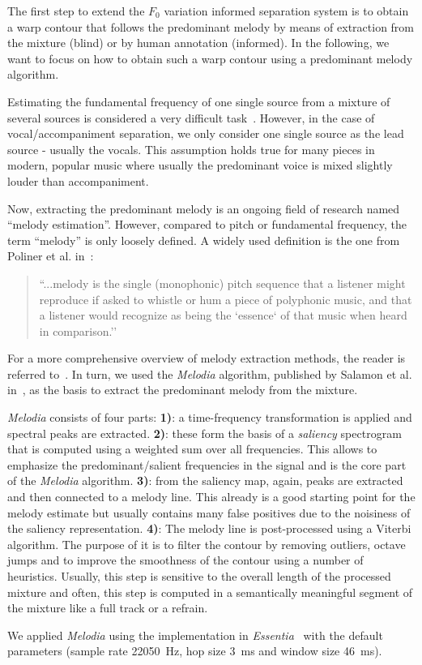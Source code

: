 The first step to extend the $F_0$ variation informed separation system is to obtain a warp contour that follows the predominant melody by means of extraction from the mixture (blind) or by human annotation (informed).
In the following, we want to focus on how to obtain such a warp contour using a predominant melody algorithm.\par

Estimating the fundamental frequency of one single source from a mixture of several sources is considered a very difficult task~\cite{klapuri08}.
However, in the case of vocal/accompaniment separation, we only consider one single source as the lead source - usually the vocals.
This assumption holds true for many pieces in modern, popular music where usually the predominant voice is mixed slightly louder than accompaniment.
\par
Now, extracting the predominant melody is an ongoing field of research named ``melody estimation''.
However, compared to pitch or fundamental frequency, the term ``melody'' is only loosely defined.
A widely used definition is the one from Poliner et al. in~\cite{poliner07}:

\begin{quote}
  ``...melody is the single (monophonic) pitch sequence that a listener might reproduce if asked to whistle or hum a piece of polyphonic music, and that a listener would recognize as being the `essence` of that music when heard in comparison.''
\end{quote}

For a more comprehensive overview of melody extraction methods, the reader is referred to~\cite{salamon14}.
In turn, we used the \emph{Melodia} algorithm, published by Salamon et al. in~\cite{salamon12}, as the basis to extract the predominant melody from the mixture.\par

\emph{Melodia} consists of four parts:
\noindent\textbf{1)}: a time-frequency transformation is applied and spectral peaks are extracted.
\textbf{2)}: these form the basis of a \emph{saliency} spectrogram that is computed using a weighted sum over all frequencies. This allows to emphasize the predominant/salient frequencies in the signal and is the core part of the \emph{Melodia} algorithm.
\textbf{3)}: from the saliency map, again, peaks are extracted and then connected to a melody line. This already is a good starting point for the melody estimate but usually contains many false positives due to the noisiness of the saliency representation.
\textbf{4)}: The melody line is post-processed using a Viterbi algorithm.
The purpose of it is to filter the contour by removing outliers, octave jumps and to improve the smoothness of the contour using a number of heuristics.
Usually, this step is sensitive to the overall length of the processed mixture and often, this step is computed in a semantically meaningful segment of the mixture like a full track or a refrain.
\par
We applied \emph{Melodia} using the implementation in \emph{Essentia}~\cite{bogdanov13} with the default parameters (sample rate \SI{22050}{\hertz}, hop size \SI{3}{\milli\second} and window size \SI{46}{\milli\second}).

